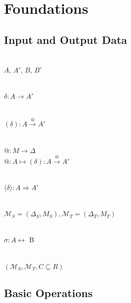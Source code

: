 \section{Foundations}
\label{sec:Foundations}


\subsection{Input and Output Data}

~\\
$A$, $A'$, $B$, $B'$

~\\
$\delta: A \rightarrow A'$

~\\
$(\delta): A \stackrel{@}{\rightarrow} A'$

~\\
$@: M \rightarrow \Delta$\\
$@: A \longmapsto (\delta): A \stackrel{@}{\rightarrow} A'$

~\\
$\langle\delta\rangle: A \Rightarrow A'$

~\\
$\mathcal{M}_S = (\Delta_S, M_S), \mathcal{M}_T = (\Delta_T, M_T)$

~\\
$\sigma : A \leftrightarrow$ B

~\\
$(\mathcal{M}_S, \mathcal{M}_T, C \subseteq R)$


\subsection{Basic Operations}

